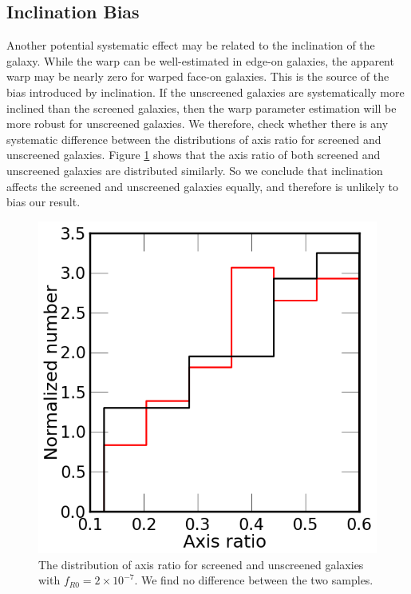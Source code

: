 \documentclass[twocolappendix, numberedappendix]{emulateapj}
\begin{document}
\subsection{Inclination Bias}
\label{ap:inclination-systematic}
Another potential systematic
effect may be related to the inclination of the galaxy.
While the warp can be well-estimated in edge-on galaxies,
the apparent warp may be nearly zero for warped face-on galaxies. This is the
source of the bias introduced by inclination.  If the unscreened galaxies
are systematically more inclined than the screened galaxies, then the warp
parameter estimation will be more robust for unscreened galaxies. 
We therefore, check whether there is any systematic difference between the
distributions of axis ratio for screened and unscreened galaxies. Figure
\ref{warp-incl} shows that the axis ratio
of both screened and unscreened galaxies are distributed similarly. So we
conclude that inclination affects the screened and unscreened galaxies
equally, and therefore is unlikely to bias our result.

\begin{figure}
\begin{center}
  \includegraphics[scale=0.4]{figures/axis-ratio-dist.png}
\caption{The distribution of axis ratio for screened and
unscreened galaxies with $f_{R0}=2\times10^{-7}$. We find no difference  between
the two samples.}
\label{warp-incl}
\end{center}
\end{figure}
\end{document}
